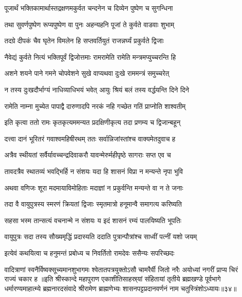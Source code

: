 \twolineshloka
{पूजार्थं भक्तिकामार्थास्तद्रक्षणमकुर्वत}
{चन्दनेन च दिव्येन पुष्पेण च सुगन्धिना}%

\twolineshloka
{तथा सुवर्णपुष्पेण रूप्यपुष्पेण वा पुनः}
{अहन्यहनि पूजां ते कुर्वते वाडवाः शुभाम्}%

\twolineshloka
{तदग्रे दीपकं चैव घृतेन विमलेन हि}
{सप्तवर्तियुतं राजन्नर्घ्यं प्रकुर्वते द्विजाः}%

\twolineshloka
{नैवेद्यं कुर्वते नित्यं भक्तिपूर्वं द्विजोत्तमाः}
{रामरामेति रामेति मन्त्रमप्युच्चरन्ति हि}%

\twolineshloka
{अशने शयने पाने गमने चोपवेशने}
{सुखे वाप्यथवा दुःखे राममन्त्रं समुच्चरेत्}%

\twolineshloka
{न तस्य दुःखदौर्भाग्यं नाधिव्याधिभयं भवेत्}
{आयुः श्रियं बलं तस्य वर्द्धयन्ति दिने दिने}%

\twolineshloka
{रामेति नाम्ना मुच्येत पापाद्वै दारुणादपि}
{नरकं नहि गच्छेत गतिं प्राप्नोति शाश्वतीम्}%


\twolineshloka
{इति कृत्वा ततो रामः कृतकृत्यममन्यत}
{प्रदक्षिणीकृत्य तदा प्रणम्य च द्विजान्बहून्}%

\twolineshloka
{दत्त्वा दानं भूरितरं गवाश्वमहिषीरथम्}
{ततः सर्वान्निजांस्तांश्च वाक्यमेतदुवाच ह}%

\twolineshloka
{अत्रैव स्थीयतां सर्वैर्यावच्चन्द्रदिवाकरौ}
{यावन्मेरुर्महीपृष्ठे सागराः सप्त एव च}%

\twolineshloka
{तावदत्रैव स्थातव्यं भवद्भिर्हि न संशयः}
{यदा हि शासनं विप्रा न मन्यन्ते नृपा भुवि}%

\twolineshloka
{अथवा वणिजः शूरा मदमायाविमोहिताः}
{मदाज्ञां न प्रकुर्वन्ति मन्यन्ते वा न ते जनाः}%

\twolineshloka
{तदा वै वायुपुत्रस्य स्मरणं क्रियतां द्विजाः}
{स्मृतमात्रो हनूमान्वै समागत्य करिष्यति}%

\twolineshloka
{सहसा भस्म तान्सत्यं वचनान्मे न संशयः}
{य इदं शासनं रम्यं पालयिष्यति भूपतिः}%

\twolineshloka
{वायुपुत्रः सदा तस्य सौख्यमृद्धिं प्रदास्यति}
{ददाति पुत्रान्पौत्रांश्च साध्वीं पत्नीं यशो जयम्}%

\twolineshloka
{इत्येवं कथयित्वा च हनुमन्तं प्रबोध्य च}
{निवर्तितो रामदेवः ससैन्यः सपरिच्छदः}%

\threelineshloka
{वादित्राणां स्वनैर्विष्वक्सूच्यमानशुभागमः}
{श्वेतातपत्रयुक्तोऽसौ चामरैर्वी जितो नरैः}
{अयोध्यां नगरीं प्राप्य चिरं राज्यं चकार ह}%
॥इति श्रीस्कान्दे महापुराण एकाशीतिसाहस्र्यां संहितायां तृतीये ब्रह्मखण्डे पूर्वभागे धर्मारण्यमाहात्म्ये ब्रह्मनारदसंवादे श्रीरामेण ब्राह्मणेभ्यः शासनपट्टप्रदानवर्णनं नाम चतुस्त्रिंशोऽध्यायः॥३४॥


